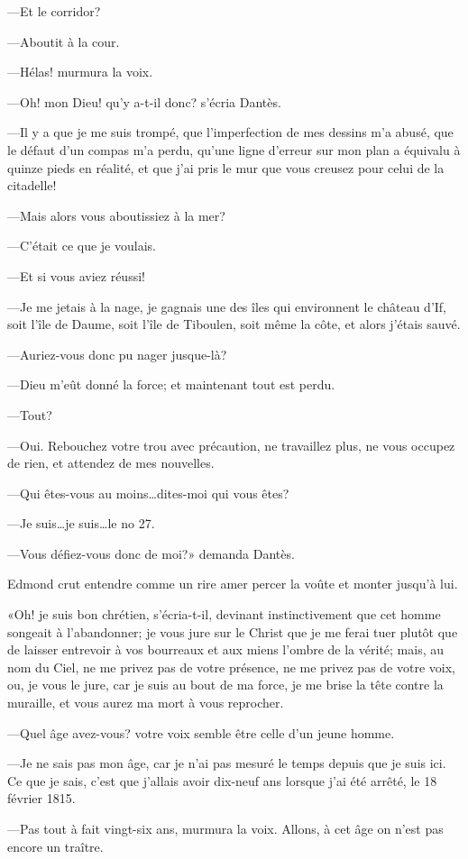 —Et le corridor?

—Aboutit à la cour.

—Hélas! murmura la voix.

—Oh! mon Dieu! qu'y a-t-il donc? s'écria Dantès.

—Il y a que je me suis trompé, que l'imperfection de mes dessins m'a abusé, que le défaut d'un compas m'a perdu, qu'une ligne d'erreur sur mon plan a équivalu à quinze pieds en réalité, et que j'ai pris le mur que vous creusez pour celui de la citadelle!

—Mais alors vous aboutissiez à la mer?

—C'était ce que je voulais.

—Et si vous aviez réussi!

—Je me jetais à la nage, je gagnais une des îles qui environnent le château d'If, soit l'île de Daume, soit l'île de Tiboulen, soit même la côte, et alors j'étais sauvé.

—Auriez-vous donc pu nager jusque-là?

—Dieu m'eût donné la force; et maintenant tout est perdu.

—Tout?

—Oui. Rebouchez votre trou avec précaution, ne travaillez plus, ne vous occupez de rien, et attendez de mes nouvelles.

—Qui êtes-vous au moins\dots dites-moi qui vous êtes?

—Je suis\dots je suis\dots le no 27.

—Vous défiez-vous donc de moi?» demanda Dantès.

Edmond crut entendre comme un rire amer percer la voûte et monter jusqu'à lui.

«Oh! je suis bon chrétien, s'écria-t-il, devinant instinctivement que cet homme songeait à l'abandonner; je vous jure sur le Christ que je me ferai tuer plutôt que de laisser entrevoir à vos bourreaux et aux miens l'ombre de la vérité; mais, au nom du Ciel, ne me privez pas de votre présence, ne me privez pas de votre voix, ou, je vous le jure, car je suis au bout de ma force, je me brise la tête contre la muraille, et vous aurez ma mort à vous reprocher.

—Quel âge avez-vous? votre voix semble être celle d'un jeune homme.

—Je ne sais pas mon âge, car je n'ai pas mesuré le temps depuis que je suis ici. Ce que je sais, c'est que j'allais avoir dix-neuf ans lorsque j'ai été arrêté, le 18 février 1815.

—Pas tout à fait vingt-six ans, murmura la voix. Allons, à cet âge on n'est pas encore un traître.

